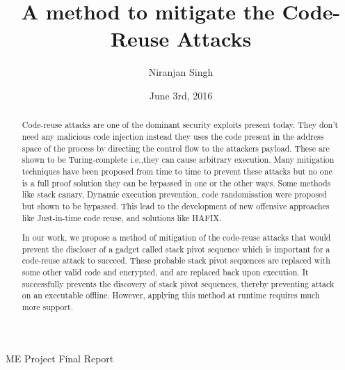 \documentclass{article}
\title{\large \bf A method to mitigate the Code-Reuse Attacks }
\author{Niranjan Singh}
\date{June 3rd, 2016}
\begin{document}
	\maketitle
    \begin{center}
        ME Project Final Report
    \end{center}
        \vskip 12pt
	\thispagestyle{empty}
	
	
		\begin{abstract}
		Code-reuse attacks are one of the dominant security exploits present today. They don't need any malicious code injection instead they uses the code present in the address space of the process by directing the control flow to the attackers payload. These are shown to be Turing-complete i.e.,they can cause arbitrary execution. Many mitigation techniques have been proposed from time to time to prevent these attacks but no one is a full proof solution they can be bypassed in one or the other ways. Some methods like stack canary, Dynamic execution prevention, code randomisation were proposed but shown to be bypassed. This lead to the development of new offensive approaches like Just-in-time code reuse, and solutions like HAFIX.
		
		In our work, we propose a method of mitigation of the code-reuse attacks that would prevent the discloser of a gadget called stack pivot sequence which is important for a code-reuse attack to succeed. These probable stack pivot sequences are replaced with some other valid code and encrypted, and are replaced back upon execution. It successfully prevents the discovery of stack pivot sequences, thereby preventing attack on an executable offline. However, applying this method at runtime requires much more support.
	\end{abstract}	
	
	\hfill \\
	
\end{document}

